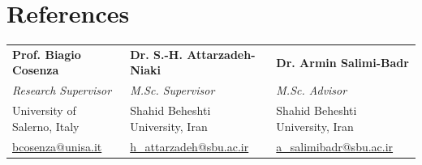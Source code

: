 \documentclass[10pt, a4paper]{article}
\begin{document}
	\section{References}
	
	\begin{tabularx}{\linewidth}{@{} X X X @{}}
		\textbf{Prof. Biagio Cosenza} &
		\textbf{Dr. S.-H. Attarzadeh-Niaki} &
		\textbf{Dr. Armin Salimi-Badr} \\[2pt]
		\textit{Research Supervisor} &
		\textit{M.Sc. Supervisor} &
		\textit{M.Sc. Advisor} \\[2pt]
		University of Salerno, Italy &
		Shahid Beheshti University, Iran &
		Shahid Beheshti University, Iran \\[2pt]
		\href{mailto:bcosenza@unisa.it}{bcosenza@unisa.it} &
		\href{mailto:h_attarzadeh@sbu.ac.ir}{h\_attarzadeh@sbu.ac.ir} &
		\href{mailto:a_salimibadr@sbu.ac.ir}{a\_salimibadr@sbu.ac.ir} \\
	\end{tabularx}

	
	\ifdefined\transcriptfile\fi
\end{document}
